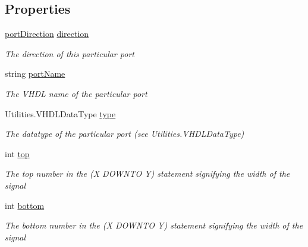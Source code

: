 \subsection*{Properties}
\begin{DoxyCompactItemize}
\item 
\hyperlink{class_n_n_gen_1_1_port_ac3b8f11a7a6bd6872e6954b64721d90c}{port\+Direction} \hyperlink{class_n_n_gen_1_1_port_a68b34b101d99494b7fa7bcb78608a6bf}{direction}
\begin{DoxyCompactList}\small\item\em The direction of this particular port \end{DoxyCompactList}\item 
string \hyperlink{class_n_n_gen_1_1_port_a0fc8ebe56a544edec825980f9961ed6d}{port\+Name}
\begin{DoxyCompactList}\small\item\em The V\+H\+D\+L name of the particular port \end{DoxyCompactList}\item 
Utilities.\+V\+H\+D\+L\+Data\+Type \hyperlink{class_n_n_gen_1_1_port_a2b45b890a0e945e39d37a1cc596d1d20}{type}
\begin{DoxyCompactList}\small\item\em The datatype of the particular port (see Utilities.\+V\+H\+D\+L\+Data\+Type) \end{DoxyCompactList}\item 
int \hyperlink{class_n_n_gen_1_1_port_ad68cf9376f181c135381671f67f03149}{top}
\begin{DoxyCompactList}\small\item\em The top number in the (X D\+O\+W\+N\+T\+O Y) statement signifying the width of the signal \end{DoxyCompactList}\item 
int \hyperlink{class_n_n_gen_1_1_port_a7bf74261a0fc7d2574c45332a301dcb3}{bottom}
\begin{DoxyCompactList}\small\item\em The bottom number in the (X D\+O\+W\+N\+T\+O Y) statement signifying the width of the signal \end{DoxyCompactList}\end{DoxyCompactItemize}


